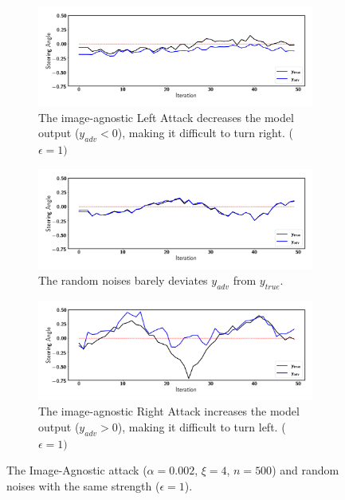 \begin{figure}[tb]
    \centering
    \begin{subfigure}[b]{0.8\textwidth}
        \includegraphics[width=\textwidth]{figures/chapter_driving/uni_left.png}
        \caption{The image-agnostic Left Attack decreases the model output ($y_{adv}<0$), making it difficult to turn right. ($\epsilon=1)$}
        \label{fig:uni_left}
    \end{subfigure}
    \begin{subfigure}[b]{0.8\textwidth}
        \includegraphics[width=\textwidth]{figures/chapter_driving/uni_random.png}
        \caption{The random noises barely deviates $y_{adv}$ from $y_{true}$.}
        \label{fig:uni_random}
    \end{subfigure}
    \begin{subfigure}[b]{0.8\textwidth}
        \includegraphics[width=\textwidth]{figures/chapter_driving/uni_right.png}
        \caption{The image-agnostic Right Attack increases the model output ($y_{adv}>0$), making it difficult to turn left. ($\epsilon=1)$}
        \label{fig:uni_right}
    \end{subfigure}
    \caption{The Image-Agnostic attack ($\alpha=0.002$, $\xi=4$, $n=500$) and random noises with the same strength ($\epsilon = 1$).}
    \label{fig:image-agnostic-online}
\end{figure}

